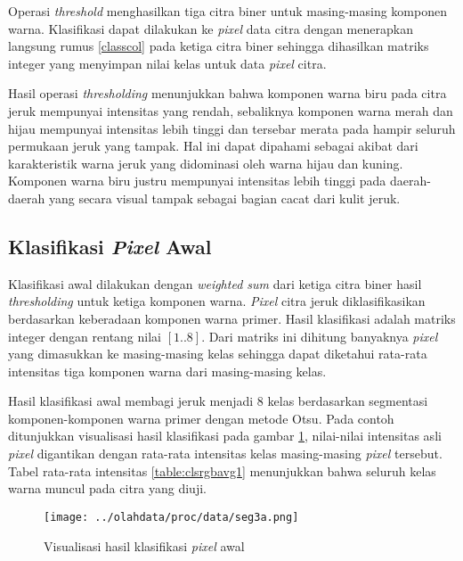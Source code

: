\documentclass[laporan.tex]{subfiles}
\begin{document}
Operasi \emph{threshold} menghasilkan tiga citra biner untuk masing-masing komponen warna. Klasifikasi dapat dilakukan ke \emph{pixel} data citra dengan menerapkan langsung \mbox{rumus} \ref{classcol} pada ketiga citra biner sehingga dihasilkan matriks integer yang menyimpan nilai kelas untuk data \emph{pixel} citra.

Hasil operasi \emph{thresholding} menunjukkan bahwa komponen warna biru pada citra jeruk mempunyai intensitas yang rendah, sebaliknya komponen warna merah dan hijau mempunyai intensitas lebih tinggi dan tersebar merata pada hampir seluruh permukaan jeruk yang tampak. Hal ini dapat dipahami sebagai akibat dari karakteristik warna jeruk yang didominasi oleh warna hijau dan kuning. Komponen warna biru justru mempunyai intensitas lebih tinggi pada daerah-daerah yang secara visual tampak sebagai bagian cacat dari kulit jeruk.

\subsection{Klasifikasi \emph{Pixel} Awal}

Klasifikasi awal dilakukan dengan \emph{weighted sum} dari ketiga citra biner hasil \emph{thresholding} untuk ketiga komponen warna. \emph{Pixel} citra jeruk diklasifikasikan berdasarkan keberadaan komponen warna primer. Hasil klasifikasi adalah matriks integer dengan rentang nilai $[1..8]$. Dari matriks ini dihitung banyaknya \emph{pixel} yang dimasukkan ke masing-masing kelas sehingga dapat diketahui rata-rata intensitas tiga komponen warna dari masing-masing kelas.

Hasil klasifikasi awal membagi jeruk menjadi 8 kelas berdasarkan segmentasi komponen-komponen warna primer dengan metode Otsu. Pada contoh ditunjukkan visualisasi hasil klasifikasi pada gambar \ref{fig:classinit}, nilai-nilai intensitas asli \emph{pixel} digantikan dengan rata-rata intensitas kelas masing-masing \emph{pixel} tersebut. Tabel rata-rata intensitas \ref{table:clsrgbavg1} menunjukkan bahwa seluruh kelas warna muncul pada citra yang diuji.

\begin{figure}[h]
\centering
\texttt{[image: ../olahdata/proc/data/seg3a.png]}
\caption{Visualisasi hasil klasifikasi \emph{pixel} awal}
\label{fig:classinit}
\end{figure}
\end{document}
